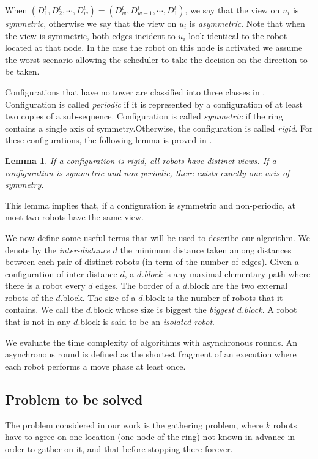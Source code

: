 \documentclass[11pt]{article}
\newtheorem{lemma}{Lemma}
\begin{document}
When $(D_1^t,D_2^t,\cdots,D_w^t)=(D_w^t,D_{w-1}^t,\cdots,D_1^t)$, we say that the view on $u_i$ is \textit{symmetric}, otherwise we say that the view on $u_{i}$ is \textit{asymmetric}. 
Note that when the view is symmetric, both edges incident to $u_{i}$ look identical to the robot located at that node. 
In the case the robot on this node is activated we assume the worst scenario allowing the scheduler to take the decision on the direction to be taken.  


Configurations that have no tower are classified into three classes in \cite{Klasing08-j}.
Configuration is called \textit{periodic} if it is represented by a configuration of at least two copies of a sub-sequence.
Configuration is called \textit{symmetric} if the ring contains a single axis of symmetry.Otherwise, the configuration is called \textit{rigid}. 
For these configurations, the following lemma is proved in \cite{Klasing06}.
\begin{lemma}
If a configuration is rigid, all robots have distinct views. If a configuration is symmetric and non-periodic, there exists exactly one axis of symmetry.
\end{lemma}
This lemma implies that, if a configuration is symmetric and non-periodic, at most two robots have the same view.

We now define some useful terms that will be used to describe our algorithm. 
We denote by the \textit{inter-distance} $d$ the minimum distance taken among distances between each pair of distinct robots (in term of the number of edges). 
Given a configuration of inter-distance $d$, a \textit{$d$.block} is any maximal elementary path where there is a robot every $d$ edges. 
The border of a $d$.block are the two external robots of the $d$.block. 
The size of a $d$.block is the number of robots that it contains. 
We call the $d$.block whose size is biggest the \textit{biggest $d$.block}.
A robot that is not in any $d$.block is said to be an \textit{isolated robot}. 

We evaluate the time complexity of algorithms with asynchronous rounds. An asynchronous round is defined as the shortest fragment of an execution where each robot performs a move phase at least once.

\subsection{Problem to be solved}\label{sec:Prb}
The problem considered in our work is the gathering problem, where $k$ robots have to agree on one location (one node of the ring) not known in advance in order to gather on it, and that before stopping there forever.
\end{document}
